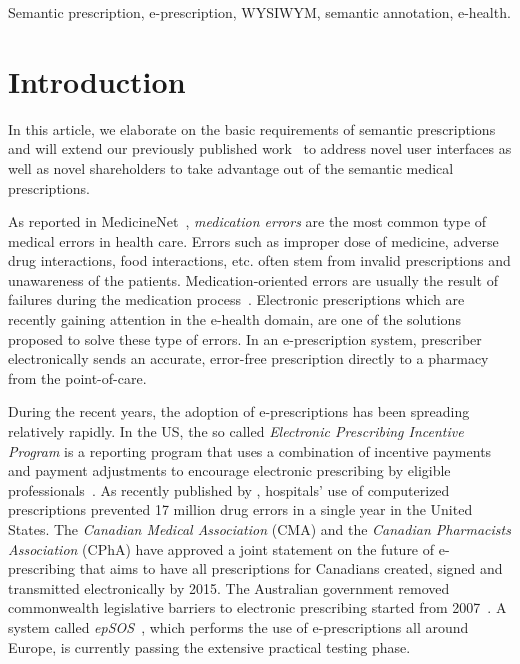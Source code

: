\documentclass[journal]{IEEEtran}
\begin{document}
\begin{IEEEkeywords}
 Semantic prescription, e-prescription, WYSIWYM, semantic annotation, e-health.
\end{IEEEkeywords}



\IEEEpeerreviewmaketitle


\section{Introduction}
\label{intro}

In this article, we elaborate on the basic requirements of semantic prescriptions and will extend our previously published work~\cite{pharmerOLD} to address novel user interfaces as well as novel shareholders to take advantage out of the semantic medical prescriptions.

As reported in MedicineNet~\cite{medicationErrors}, \emph{medication errors} are the most common type of medical errors in health care.
Errors such as improper dose of medicine, adverse drug interactions, food interactions, etc. often stem from invalid prescriptions and unawareness of the patients.
Medication-oriented errors are usually the result of failures during the medication process~\cite{SemMed}.
Electronic prescriptions which are recently gaining attention in the e-health domain, are one of the solutions proposed to solve these type of errors.
In an e-prescription system, prescriber electronically sends an accurate, error-free prescription directly to a pharmacy from the point-of-care.

During the recent years, the adoption of e-prescriptions has been spreading relatively rapidly.
In the US, the so called \emph{Electronic Prescribing Incentive Program} is a reporting program that uses a combination of incentive payments and payment adjustments to encourage electronic prescribing by eligible professionals~\cite{epincentive}.
As recently published by \cite{eprescStat2013}, hospitals' use of computerized prescriptions prevented 17 million drug errors in a single year in the United States.
The \emph{Canadian Medical Association} (CMA) and the \emph{Canadian Pharmacists Association} (CPhA) have approved a joint statement on the future of e-prescribing that aims to have all prescriptions for Canadians created, signed and transmitted electronically by 2015.
The Australian government removed commonwealth legislative barriers to electronic prescribing started from 2007~\cite{medicare}.
A system called \emph{epSOS}~\cite{epsos}, which performs the use of e-prescriptions all around Europe, is currently passing the extensive practical testing phase.
\end{document}
